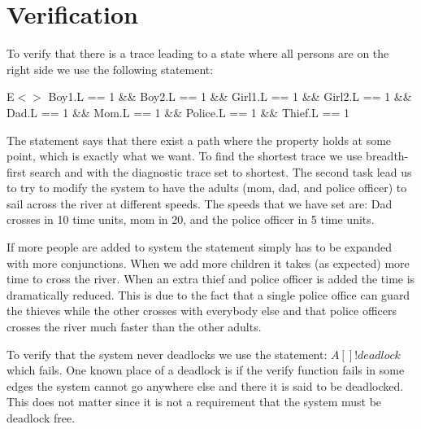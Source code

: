 \section{Verification}
To verify that there is a trace leading to a state where all persons are on the right side we use the following statement:

E$<>$ Boy1.L == 1 \&\& Boy2.L == 1 \&\& Girl1.L == 1 \&\& Girl2.L == 1 \&\& Dad.L == 1 \&\& Mom.L == 1 \&\& Police.L == 1 \&\& Thief.L == 1

The statement says that there exist a path where the property holds at some point, which is exactly what we want. 
To find the shortest trace we use breadth-first search and with the diagnostic trace set to shortest. 
The second task lead us to try to modify the system to have the adults (mom, dad, and police officer) to sail across the river at different speeds.
The speeds that we have set are: Dad crosses in 10 time units, mom in 20, and the police officer in 5 time units.

If more people are added to system the statement simply has to be expanded with more conjunctions. 
When we add more children it takes (as expected) more time to cross the river.
When an extra thief and police officer is added the time is dramatically reduced.
This is due to the fact that a single police office can guard the thieves while the other crosses with everybody else and that police officers crosses the river much faster than the other adults.

To verify that the system never deadlocks we use the statement:
$A[] !deadlock$ which fails. 
One known place of a deadlock is if the verify function fails in some edges the system cannot go anywhere else and there it is said to be deadlocked. 
This does not matter since it is not a requirement that the system must be deadlock free. 
